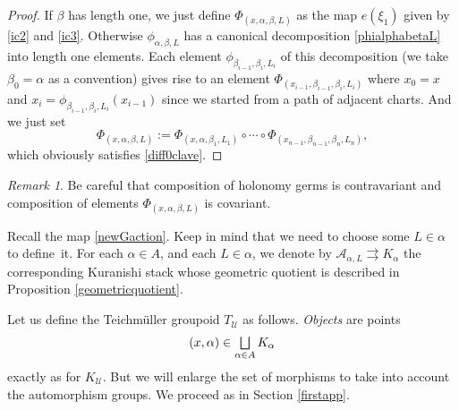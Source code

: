 \documentclass[JEP,XML,SOM,Unicode]{cedram}
\let\mathcal\mathscr
\let\oldbigsqcup\bigsqcup
\renewcommand{\bigsqcup}{\mathop{\textstyle\oldbigsqcup}\displaylimits}
\theoremstyle{plain}
\theoremstyle{definition}
\theoremstyle{remark}
\newtheorem{remark}[theorem]{Remark}
\numberwithin{equation}{section}
\let\uniondisjointe\bigsqcup
\begin{document}
\begin{proof}
If $\beta$ has length one, we just define $\Phi_{(x,\alpha,\beta, L)}$ as the map $e(\xi_1)$ given by \eqref{ic2} and \eqref{ic3}. Otherwise $\phi_{\alpha,\beta, L}$ has a canonical decomposition
\eqref{phialphabetaL} into length one elements. Each element $\phi_{\beta_{i-1},\beta_i,L_i}$ of this decomposition (we take $\beta_0=\alpha$ as a convention) gives rise to an element $\Phi_{(x_{i-1},\beta_{i-1},\beta_i, L_i)}$ where $x_0=x$ and $x_i=\phi_{\beta_{i-1},\beta_i,L_i}(x_{i-1})$ since we started from a path of adjacent charts. And we just set
\begin{equation}
\label{Phi}
\Phi_{(x,\alpha,\beta, L)}:=\Phi_{(x,\alpha,\beta_1, L_1)}\circ\cdots\circ
\Phi_{(x_{n-1},\beta_{n-1},\beta_n, L_n)},
\end{equation}
which obviously satisfies \eqref{diff0clave}.
\end{proof}
\begin{remark}
\label{contravsco}
Be careful that composition of holonomy germs is contravariant and composition of elements $\Phi_{(x,\alpha,\beta, L)}$ is covariant.
\end{remark}

Recall the map \eqref{newGaction}. Keep in mind that we need to choose some $L\in\alpha$ to define~it.
For each $\alpha\in A$, and each $L\in\alpha$, we denote by $\mathcal A_{\alpha,L}\rightrightarrows K_\alpha$ the corresponding Kuranishi stack whose geometric quotient is described in Proposition \ref{geometricquotient}.

Let us define the Teichmüller groupoid $T_{\mathcal U}$ as follows. \emph{Objects} are points
\begin{equation}
\label{objectsteich}
(x,\alpha)\in\uniondisjointe_{\alpha\in A}K_{\alpha}
\end{equation}
exactly as for $K_{\mathcal U}$. But we will enlarge the set of morphisms to take into account the automorphism groups. We proceed as in Section \ref{firstapp}.
\end{document}

